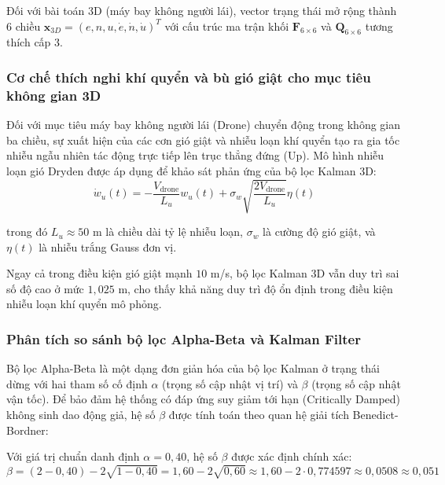 Đối với bài toán 3D (máy bay không người lái), vector trạng thái mở rộng thành 6 chiều $\mathbf{x}_{3D} = (e, n, u, \dot{e}, \dot{n}, \dot{u})^T$ với cấu trúc ma trận khối $\mathbf{F}_{6 \times 6}$ và $\mathbf{Q}_{6 \times 6}$ tương thích cấp 3.

\subsubsection{Cơ chế thích nghi khí quyển và bù gió giật cho mục tiêu không gian 3D}

\hspace{0.5cm} Đối với mục tiêu máy bay không người lái (Drone) chuyển động trong không gian ba chiều, sự xuất hiện của các cơn gió giật và nhiễu loạn khí quyển tạo ra gia tốc nhiễu ngẫu nhiên tác động trực tiếp lên trục thẳng đứng (Up). Mô hình nhiễu loạn gió Dryden được áp dụng để khảo sát phản ứng của bộ lọc Kalman 3D:
\begin{equation}
\dot{w}_u(t) = -\frac{V_{\text{drone}}}{L_u} w_u(t) + \sigma_w \sqrt{\frac{2 V_{\text{drone}}}{L_u}} \eta(t)
\label{eq:dryden-wind-model}
\end{equation}

trong đó $L_u \approx 50$ m là chiều dài tỷ lệ nhiễu loạn, $\sigma_w$ là cường độ gió giật, và $\eta(t)$ là nhiễu trắng Gauss đơn vị.

Ngay cả trong điều kiện gió giật mạnh $10$ m/s, bộ lọc Kalman 3D vẫn duy trì sai số độ cao ở mức $1{,}025$ m, cho thấy khả năng duy trì độ ổn định trong điều kiện nhiễu loạn khí quyển mô phỏng.



\subsubsection{Phân tích so sánh bộ lọc Alpha-Beta và Kalman Filter}

\hspace{0.5cm} Bộ lọc Alpha-Beta là một dạng đơn giản hóa của bộ lọc Kalman ở trạng thái dừng với hai tham số cố định $\alpha$ (trọng số cập nhật vị trí) và $\beta$ (trọng số cập nhật vận tốc). Để bảo đảm hệ thống có đáp ứng suy giảm tới hạn (Critically Damped) không sinh dao động giả, hệ số $\beta$ được tính toán theo quan hệ giải tích Benedict-Bordner:


Với giá trị chuẩn danh định $\alpha = 0{,}40$, hệ số $\beta$ được xác định chính xác:
\begin{equation}
\beta = (2 - 0{,}40) - 2\sqrt{1 - 0{,}40} = 1{,}60 - 2\sqrt{0{,}60} \approx 1{,}60 - 2 \cdot 0{,}774597 \approx 0{,}0508 \approx 0{,}051
\label{eq:beta-calculation}
\end{equation}


